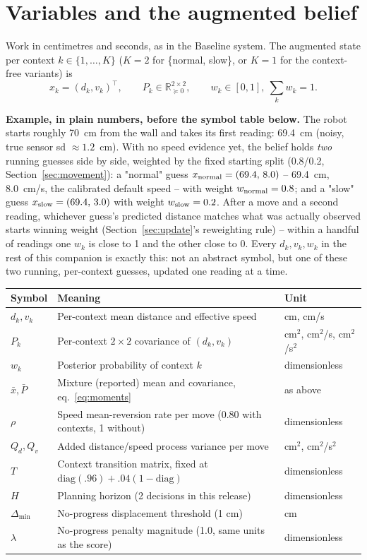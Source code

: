 \documentclass[11pt,a4paper]{article}
\newcommand{\code}[1]{\texttt{\detokenize{#1}}}
\begin{document}
\section{Variables and the augmented belief}
\label{sec:shared}
Work in centimetres and seconds, as in the Baseline system. The augmented state per context $k\in\{1,\dots,K\}$ ($K=2$ for \{normal, slow\}, or $K=1$ for the context-free \code{adaptive} variants) is
\[
x_k=(d_k,v_k)^\top,\qquad P_k\in\mathbb R^{2\times2}_{\succeq0},\qquad w_k\in[0,1],\ \textstyle\sum_k w_k=1.
\]
\colorbox{ice}{\parbox{.95\linewidth}{\small\textbf{Example, in plain numbers, before the symbol table below.} The robot starts
roughly 70~cm from the wall and takes its first reading: 69.4~cm (noisy, true sensor
sd $\approx1.2$~cm). With no speed evidence yet, the belief holds \emph{two} running
guesses side by side, weighted by the fixed starting split (0.8/0.2, Section~\ref{sec:movement}):
a "normal" guess $x_{\rm normal}=(69.4,\,8.0)$ -- 69.4~cm, 8.0~cm/s, the calibrated
default speed -- with weight $w_{\rm normal}=0.8$; and a "slow" guess
$x_{\rm slow}=(69.4,\,3.0)$ with weight $w_{\rm slow}=0.2$. After a move and a second
reading, whichever guess's predicted distance matches what was actually observed
starts winning weight (Section~\ref{sec:update}'s reweighting rule) -- within a
handful of readings one $w_k$ is close to 1 and the other close to 0. Every
$d_k,v_k,w_k$ in the rest of this companion is exactly this: not an abstract symbol,
but one of these two running, per-context guesses, updated one reading at a time.}}\par\vspace{4pt}
\begin{longtable}{p{.15\linewidth}p{.57\linewidth}p{.18\linewidth}}
\toprule Symbol & Meaning & Unit\\\midrule\endhead
$d_k,v_k$ & Per-context mean distance and effective speed & cm, cm/s\\
$P_k$ & Per-context $2\times2$ covariance of $(d_k,v_k)$ & cm$^2$, cm$^2$/s, cm$^2$/s$^2$\\
$w_k$ & Posterior probability of context $k$ & dimensionless\\
$\bar x,\bar P$ & Mixture (reported) mean and covariance, eq.~\eqref{eq:moments} & as above\\
$\rho$ & Speed mean-reversion rate per move (0.80 with contexts, 1 without) & dimensionless\\
$Q_d,Q_v$ & Added distance/speed process variance per move & cm$^2$, cm$^2$/s$^2$\\
$T$ & Context transition matrix, fixed at $\mathrm{diag}(.96)+.04(1-\mathrm{diag})$ & dimensionless\\
$H$ & Planning horizon (2 decisions in this release) & dimensionless\\
$\Delta_{\min}$ & No-progress displacement threshold (1 cm) & cm\\
$\lambda$ & No-progress penalty magnitude (1.0, same units as the score) & dimensionless\\
\bottomrule
\end{longtable}
\end{document}
